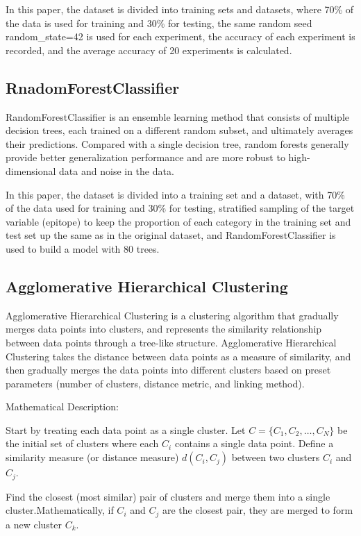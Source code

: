 \documentclass[conference]{IEEEtran}
\begin{document}
	In this paper, the dataset is divided into training sets and datasets, where 70\% of the data is used for training and 30\% for testing, the same random seed random\_state=42 is used for each experiment, the accuracy of each experiment is recorded, and the average accuracy of 20 experiments is calculated.
	
	\subsection{RnadomForestClassifier}\label{AA}
	RandomForestClassifier is an ensemble learning method that consists of multiple decision trees, each trained on a different random subset, and ultimately averages their predictions. Compared with a single decision tree, random forests generally provide better generalization performance and are more robust to high-dimensional data and noise in the data.
	
	In this paper, the dataset is divided into a training set and a dataset, with 70\% of the data used for training and 30\% for testing, stratified sampling of the target variable (epitope) to keep the proportion of each category in the training set and test set up the same as in the original dataset, and RandomForestClassifier is used to build a model with 80 trees.
	
	\subsection{Agglomerative Hierarchical Clustering}\label{AA}
	Agglomerative Hierarchical Clustering is a clustering algorithm that gradually merges data points into clusters, and represents the similarity relationship between data points through a tree-like structure. Agglomerative Hierarchical Clustering takes the distance between data points as a measure of similarity, and then gradually merges the data points into different clusters based on preset parameters (number of clusters, distance metric, and linking method).
	
	Mathematical Description:
	
	Start by treating each data point as a single cluster. Let $C = \{C_1, C_2, \ldots, C_N\}$ be the initial set of clusters where each $C_i$ contains a single data point. Define a similarity measure (or distance measure) $d(C_i, C_j)$ between two clusters $C_i$ and $C_j$.
	
	Find the closest (most similar) pair of clusters and merge them into a single cluster.Mathematically, if $C_i$ and $C_j$ are the closest pair, they are merged to form a new cluster $C_k$.
	
\end{document}
